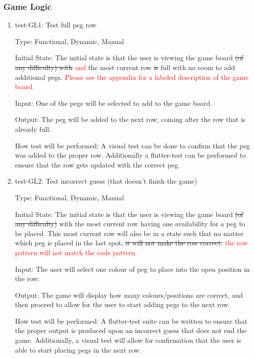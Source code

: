 \documentclass[12pt, titlepage]{article}
\begin{document}
\subsubsection{Game Logic}

\begin{enumerate}

\item{test-GL1: Test full peg row\\}

Type: Functional, Dynamic, Manual
					
Initial State: The  initial  state  is  that  the  user  is  viewing  the  game board \sout{(of any difficulty) with} \textcolor{red}{and} the most current row \sout{is} full with no room to add additional pegs. \textcolor{red}{Please see the appendix for a labeled description of the game board.}
					
Input: One of the pegs will be selected to add to the game board.
					
Output: The peg will be added to the next row, coming after the row that is already full.
					
How test will be performed: A visual test can be done to confirm that the peg was added to the proper row. Additionally a flutter-test can be performed to ensure that the row gets updated with the correct peg.

\item{test-GL2: Test incorrect guess (that doesn't finish the game)\\}

Type: Functional, Dynamic, Manual
					
Initial State: The  initial  state  is  that  the  user  is  viewing  the  game board \sout{(of any difficulty)} with the most current row having one availability for a peg to be placed. This most current row will also be in a state such that no matter which peg is placed in the last spot, \sout{it will not make the row correct.} \textcolor{red}{the row pattern will not match the code pattern.}
					
Input: The user will select one colour of peg to place into the open position in the row.
					
Output: The game will display how many colours/positions are correct, and then proceed to allow for the user to start adding pegs to the next row.
					
How test will be performed: A flutter-test suite can be written to ensure that the proper output is produced upon an incorrect guess that does not end the game. Additionally, a visual test will allow for confirmation that the user is able to start placing pegs in the next row.


\end{enumerate}
\end{document}
